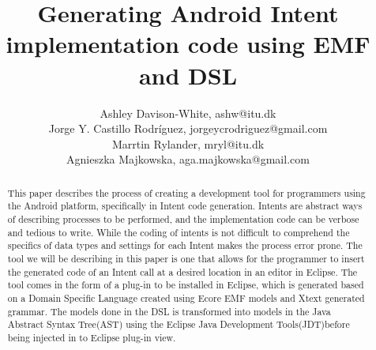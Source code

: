 \documentclass[12pt]{article}
\title{Generating Android Intent implementation code using EMF and DSL}
\author{Ashley Davison-White, ashw@itu.dk 
        \\Jorge Y. Castillo Rodríguez, jorgeycrodriguez@gmail.com
        \\Marrtin Rylander, mryl@itu.dk
        \\Agnieszka Majkowska, aga.majkowska@gmail.com
}
\begin{document}
\maketitle

\begin{abstract}
This paper describes the process of creating a development tool for programmers using the Android platform, specifically in Intent code generation.
Intents are abstract ways of describing processes to be performed, and the implementation code can be verbose and tedious to write. While the coding of intents is not difficult to comprehend the specifics of data types and settings for each Intent makes the process error prone. The tool we will be describing in this paper is one that allows for the programmer to insert the generated code of an Intent call at a desired location in an editor in Eclipse.
The tool comes in the form of a plug-in to be installed in Eclipse, which is generated based on a Domain Specific Language created using Ecore EMF models and Xtext generated grammar.
The models done in the DSL is transformed into models in the Java Abstract Syntax Tree(AST) using the Eclipse Java Development Tools(JDT)before being injected in to Eclipse plug-in view.   
\end{abstract}




















\end{document}
